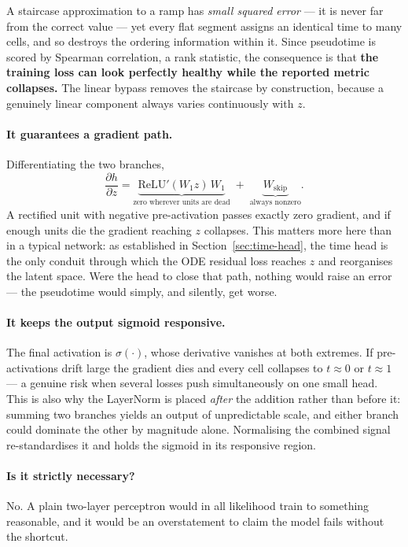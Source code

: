 \documentclass[11pt,a4paper]{article}
\newenvironment{keybox}{\begin{shaded}\noindent}{\end{shaded}}
\theoremstyle{definition}
\begin{document}
\begin{keybox}
A staircase approximation to a ramp has \emph{small squared error} --- it is
never far from the correct value --- yet every flat segment assigns an identical
time to many cells, and so destroys the ordering information within it. Since
pseudotime is scored by Spearman correlation, a rank statistic, the consequence
is that \textbf{the training loss can look perfectly healthy while the reported
metric collapses.} The linear bypass removes the staircase by construction,
because a genuinely linear component always varies continuously with $z$.
\end{keybox}

\paragraph{It guarantees a gradient path.} Differentiating the two branches,
%
\begin{equation}
\frac{\partial h}{\partial z}
= \underbrace{\mathrm{ReLU}'(W_1 z)\, W_1}_{\text{zero wherever units are dead}}
\;+\; \underbrace{W_{\text{skip}}}_{\text{always nonzero}} .
\end{equation}
%
A rectified unit with negative pre-activation passes exactly zero gradient, and
if enough units die the gradient reaching $z$ collapses. This matters more here
than in a typical network: as established in Section~\ref{sec:time-head}, the
time head is the only conduit through which the ODE residual loss reaches $z$
and reorganises the latent space. Were the head to close that path, nothing
would raise an error --- the pseudotime would simply, and silently, get worse.

\paragraph{It keeps the output sigmoid responsive.} The final activation is
$\sigma(\cdot)$, whose derivative vanishes at both extremes. If pre-activations
drift large the gradient dies and every cell collapses to $t \approx 0$ or
$t \approx 1$ --- a genuine risk when several losses push simultaneously on one
small head. This is also why the LayerNorm is placed \emph{after} the addition
rather than before it: summing two branches yields an output of unpredictable
scale, and either branch could dominate the other by magnitude alone.
Normalising the combined signal re-standardises it and holds the sigmoid in its
responsive region.

\paragraph{Is it strictly necessary?} No. A plain two-layer perceptron would in
all likelihood train to something reasonable, and it would be an overstatement
to claim the model fails without the shortcut.
\end{document}
